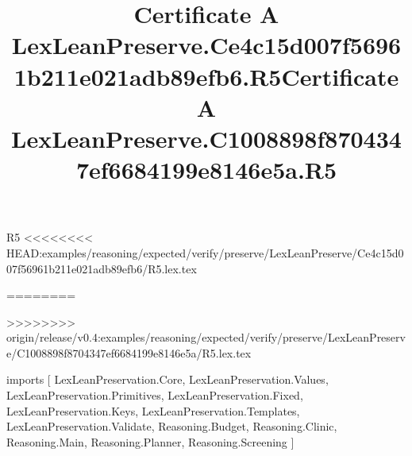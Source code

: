 \begin{lexlean}{R5}
<<<<<<<< HEAD:examples/reasoning/expected/verify/preserve/LexLeanPreserve/Ce4c15d007f56961b211e021adb89efb6/R5.lex.tex
\title{Certificate A LexLeanPreserve.Ce4c15d007f56961b211e021adb89efb6.R5}
========
\title{Certificate A LexLeanPreserve.C1008898f8704347ef6684199e8146e5a.R5}
>>>>>>>> origin/release/v0.4:examples/reasoning/expected/verify/preserve/LexLeanPreserve/C1008898f8704347ef6684199e8146e5a/R5.lex.tex
\begin{coremodule}
imports [
  LexLeanPreservation.Core,
  LexLeanPreservation.Values,
  LexLeanPreservation.Primitives,
  LexLeanPreservation.Fixed,
  LexLeanPreservation.Keys,
  LexLeanPreservation.Templates,
  LexLeanPreservation.Validate,
  Reasoning.Budget,
  Reasoning.Clinic,
  Reasoning.Main,
  Reasoning.Planner,
  Reasoning.Screening
]


\end{coremodule}
\end{lexlean}
